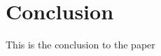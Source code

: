 \documentclass[/../base.tex]{subfiles}
\begin{document}
\section{Conclusion}
\label{conclusion}

This is the conclusion to the paper
\end{document}
